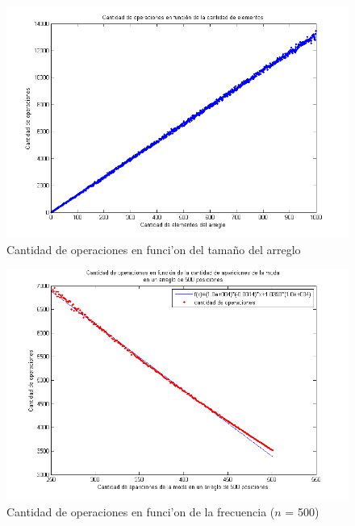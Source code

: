 \begin{figure}[H]
\centering
\includegraphics[scale=0.8]{../../codigo/ejercicio3/benchmark/graficos/corridas_aleatorias_n_creciente/grafico.png}
\caption{Cantidad de operaciones en funci'on del tama\~{n}o del arreglo}
\end{figure}

\begin{figure}[H]
\centering
\includegraphics[scale=0.8]{../../codigo/ejercicio3/benchmark/graficos/frecuencia/frecuencia.png}
\caption{Cantidad de operaciones en funci'on de la frecuencia ($n$ = 500)}
\end{figure}

